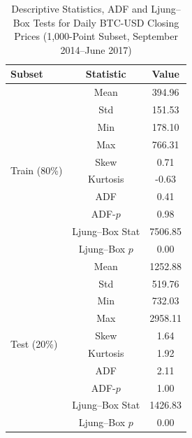 
\begin{table}[H]
\centering
\caption{Descriptive Statistics, ADF and Ljung--Box Tests for Daily BTC-USD Closing Prices (1,000-Point Subset, September 2014–June 2017)}
\label{tab:descriptive_stats_vertical}
\begin{tabular}{lcc}
\hline
\textbf{Subset} & \textbf{Statistic} & \textbf{Value} \\
\hline
\multirow{10}{*}{Train (80\%)} 
 & Mean & 394.96 \\
 & Std & 151.53 \\
 & Min & 178.10 \\
 & Max & 766.31 \\
 & Skew & 0.71 \\
 & Kurtosis & -0.63 \\
 & ADF & 0.41 \\
 & ADF-$p$ & 0.98 \\
 & Ljung--Box Stat & 7506.85 \\
 & Ljung--Box $p$ & 0.00 \\
\hline
\multirow{10}{*}{Test (20\%)} 
 & Mean & 1252.88 \\
 & Std & 519.76 \\
 & Min & 732.03 \\
 & Max & 2958.11 \\
 & Skew & 1.64 \\
 & Kurtosis & 1.92 \\
 & ADF & 2.11 \\
 & ADF-$p$ & 1.00 \\
 & Ljung--Box Stat & 1426.83 \\
 & Ljung--Box $p$ & 0.00 \\
\hline
\end{tabular}
\end{table}

